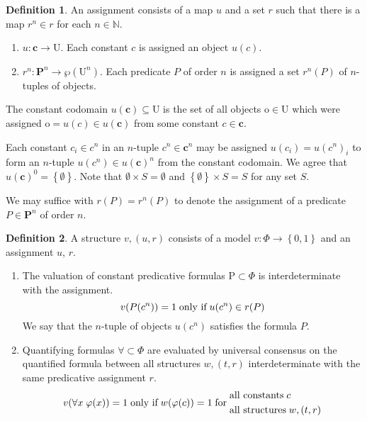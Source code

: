 \documentclass{amsbook}
\newcommand{\setsm}[1]{\left\{#1\right\}}
\newcommand{\univ}[1]{\mathord\forall#1\;}
\theoremstyle{definition}
\newtheorem{dfn}{Definition}[section]
\begin{document}
\begin{dfn}
    An assignment consists of a map $u$ and a set $r$ such that there is a map $r^n \in r$ for each $n \in \mathbb N$.
    \begin{enumerate}
        \item $u: \mathbf c \longrightarrow \mathrm U$.
              Each constant $c$ is assigned an object $u(c)$.
        \item $r^n: \mathbf P^n \longrightarrow \wp(\mathrm U^n)$.
              Each predicate $P$ of order $n$ is assigned a set $r^n(P)$ of $n$-tuples of objects.
    \end{enumerate}

    The constant codomain $u(\mathbf c) \subseteq \mathrm U$ is the set of all objects $\mathrm o \in \mathrm U$ which were assigned $\mathrm o = u(c) \in u(\mathbf c)$ from some constant $c \in \mathbf c$.

    Each constant $c_i \in c^n$ in an $n$-tuple $c^n \in \mathbf c^n$ may be assigned $u(c_i) = u(c^n)_i$ to form an $n$-tuple $u(c^n) \in u(\mathbf c)^n$ from the constant codomain. We agree that $u(\mathbf c)^0 = \setsm{\emptyset}$. Note that $\emptyset \times S = \emptyset$ and $\setsm\emptyset \times S = S$ for any set $S$.

    We may suffice with $r(P) = r^n(P)$ to denote the assignment of a predicate $P \in \mathbf P^n$ of order $n$.
\end{dfn}

\begin{dfn}
    A structure $v, (u, r)$ consists of a model $v: \Phi \longrightarrow \setsm{0,1}$ and an assignment $u$, $r$.
    \begin{enumerate}
        \item
              The valuation of constant predicative formulas $\mathrm P \subset \Phi$ is interdeterminate with the assignment.
              $$v(P(c^n)) = 1 \text{\;only if\;} u(c^n) \in r(P)$$
              We say that the $n$-tuple of objects $u(c^n)$ satisfies the formula $P$.
        \item
              Quantifying formulas $\mathord\forall \subset \Phi$ are evaluated by universal consensus on the quantified formula between all structures $w, (t, r)$ interdeterminate with the same predicative assignment $r$.
              $$v(\univ x \varphi(x)) = 1 \text{\;only if\;} w(\varphi(c)) = 1 \text{\;for\;} \begin{aligned}
                       & \text{all constants\;} c \\
                       &
                      \text{all structures\;}
                      w, (t, r)
                  \end{aligned}$$
    \end{enumerate}
\end{dfn}
\end{document}
